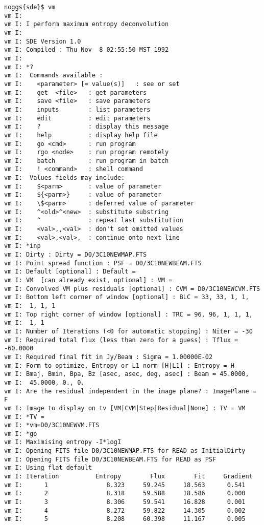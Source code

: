 \begin{verbatim}
noggs{sde}$ vm
vm I:
vm I: I perform maximum entropy deconvolution
vm I:
vm I: SDE Version 1.0
vm I: Compiled : Thu Nov  8 02:55:50 MST 1992
vm I:
vm I: *?
vm I:  Commands available :
vm I:    <parameter> [= value(s)]   : see or set
vm I:    get  <file>   : get parameters
vm I:    save <file>   : save parameters
vm I:    inputs        : list parameters
vm I:    edit          : edit parameters
vm I:    ?             : display this message
vm I:    help          : display help file
vm I:    go <cmd>      : run program
vm I:    rgo <node>    : run program remotely
vm I:    batch         : run program in batch
vm I:    ! <command>   : shell command
vm I:  Values fields may include:
vm I:    $<parm>       : value of parameter
vm I:    ${<parm>}     : value of parameter
vm I:    \$<parm>      : deferred value of parameter
vm I:    ^<old>^<new>  : substitute substring
vm I:    ^             : repeat last substitution
vm I:    <val>,,<val>  : don't set omitted values
vm I:    <val>,<val>,  : continue onto next line
vm I: *inp
vm I: Dirty : Dirty = D0/3C10NEWMAP.FTS
vm I: Point spread function : PSF = D0/3C10NEWBEAM.FTS
vm I: Default [optional] : Default =
vm I: VM  [can already exist, optional] : VM =
vm I: Convolved VM plus residuals [optional] : CVM = D0/3C10NEWCVM.FTS
vm I: Bottom left corner of window [optional] : BLC = 33, 33, 1, 1,
vm I:  1, 1, 1
vm I: Top right corner of window [optional] : TRC = 96, 96, 1, 1, 1,
vm I:  1, 1
vm I: Number of Iterations (<0 for automatic stopping) : Niter = -30
vm I: Required total flux (less than zero for a guess) : Tflux = -60.0000
vm I: Required final fit in Jy/Beam : Sigma = 1.00000E-02
vm I: Form to optimize, Entropy or L1 norm [H|L1] : Entropy = H
vm I: Bmaj, Bmin, Bpa, Bz [asec, asec, deg, asec] : Beam = 45.0000,
vm I:  45.0000, 0., 0.
vm I: Are the residual independent in the image plane? : ImagePlane = F
vm I: Image to display on tv [VM|CVM|Step|Residual|None] : TV = VM
vm I: *TV =
vm I: *vm=D0/3C10NEWVM.FTS
vm I: *go
vm I: Maximising entropy -I*logI
vm I: Opening FITS file D0/3C10NEWMAP.FTS for READ as InitialDirty
vm I: Opening FITS file D0/3C10NEWBEAM.FTS for READ as PSF
vm I: Using flat default
vm I: Iteration          Entropy        Flux        Fit     Gradient
vm I:      1                8.323     59.245     18.563      0.541
vm I:      2                8.318     59.588     18.586      0.000
vm I:      3                8.306     59.541     16.828      0.001
vm I:      4                8.272     59.822     14.305      0.002
vm I:      5                8.208     60.398     11.167      0.005

\end{verbatim}

